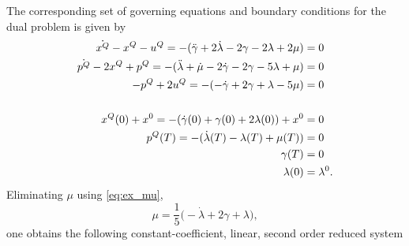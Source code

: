 \documentclass[11pt]{article}
\begin{document}
The corresponding set of governing equations and boundary conditions for the dual problem is given by
\begin{subequations}
    \begin{align}
        \dot{x^Q} - x^Q - u^Q  = -(\ddot{\gamma} + 2 \dot{\lambda}  - 2 \gamma - 2 \lambda + 2 \mu) & = 0 \notag\\
        \dot{p^Q} - 2 x^Q + p^Q  = -(\ddot{\lambda} + \dot{\mu} - 2 \dot{\gamma} - 2 \gamma - 5 \lambda + \mu) & = 0 \notag\\
        - p^Q + 2 u^Q  = -(- \dot{\gamma} + 2 \gamma + \lambda - 5 \mu) & = 0 \label{eq:ex_mu}\\
        \notag \\
        x^Q(0) + x^0  = -(\dot{\gamma}(0) + \gamma(0) + 2 \lambda(0)) + x^0 & = 0 \notag\\
        p^Q(T)  = -(\dot{\lambda}(T) - \lambda(T) + \mu(T)) & = 0 \notag\\
         \qquad \gamma(T) & = 0 \notag\\
         \qquad \lambda(0) & = \lambda^0. \notag
    \end{align}
\end{subequations}
Eliminating $\mu$ using \eqref{eq:ex_mu},
\[
\mu = \frac{1}{5} \big( - \dot{\lambda} + 2 \gamma + \lambda \big),
\]
one obtains the following constant-coefficient, linear, second order reduced system
\end{document}

